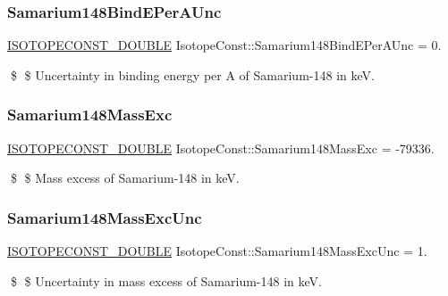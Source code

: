\subsubsection{\texorpdfstring{Samarium148\+Bind\+E\+Per\+A\+Unc}{Samarium148BindEPerAUnc}}
{\footnotesize\ttfamily \mbox{\hyperlink{group___isotope_const-_macros_ga8f45a7272ce02c0b4c65c44636ed719a}{I\+S\+O\+T\+O\+P\+E\+C\+O\+N\+S\+T\+\_\+\+D\+O\+U\+B\+LE}} Isotope\+Const\+::\+Samarium148\+Bind\+E\+Per\+A\+Unc = 0.}

\$ \$ Uncertainty in binding energy per A of Samarium-\/148 in keV. \mbox{\label{group___isotope_const-_samarium-_sm148_gade969bb7ee545825d3b393b0dc5faa73}} 
\subsubsection{\texorpdfstring{Samarium148\+Mass\+Exc}{Samarium148MassExc}}
{\footnotesize\ttfamily \mbox{\hyperlink{group___isotope_const-_macros_ga8f45a7272ce02c0b4c65c44636ed719a}{I\+S\+O\+T\+O\+P\+E\+C\+O\+N\+S\+T\+\_\+\+D\+O\+U\+B\+LE}} Isotope\+Const\+::\+Samarium148\+Mass\+Exc = -\/79336.}

\$ \$ Mass excess of Samarium-\/148 in keV. \mbox{\label{group___isotope_const-_samarium-_sm148_ga0c1ac6f344305500427a07f1f292e7ef}} 
\subsubsection{\texorpdfstring{Samarium148\+Mass\+Exc\+Unc}{Samarium148MassExcUnc}}
{\footnotesize\ttfamily \mbox{\hyperlink{group___isotope_const-_macros_ga8f45a7272ce02c0b4c65c44636ed719a}{I\+S\+O\+T\+O\+P\+E\+C\+O\+N\+S\+T\+\_\+\+D\+O\+U\+B\+LE}} Isotope\+Const\+::\+Samarium148\+Mass\+Exc\+Unc = 1.}

\$ \$ Uncertainty in mass excess of Samarium-\/148 in keV. \mbox{\label{group___isotope_const-_samarium-_sm148_ga75865c90c0494f276ada67d6dec184a6}} 
